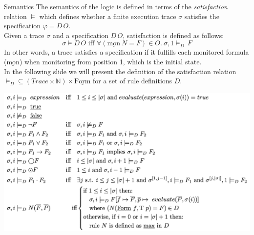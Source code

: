\documentclass[aspectratio=169,t,xcolor=table]{beamer}
\begin{document}
\begin{frame}[allowframebreaks]{Semantics}
    The semantics of the logic is defined in terms of the \textit{satisfaction} relation $\models$ which defines whether a finite execution trace $\sigma$ satisfies the specification $\varphi=D \, O$.\\
    \vspace*{5mm}
    Given a trace $\sigma$ and a specification $D \, O$, satisfaction is defined as follows:
    \[
    \sigma \models D \, O \text{ iff } \forall (\underline{\text{mon}}\ N = F) \in O.\ \sigma ,1 \models_D \, F
    \]
    In other words, a trace satisfies a specification if it fulfills each monitored formula ($\underline{\text{mon}}$) when monitoring from position 1, which is the initial state.\\
    \vspace*{5mm}
    In the following slide we will present the definition of the satisfaction relation $\models_D \subseteq (Trace \times \mathbb{N}) \times \underline{\text{Form}}$ for a set of rule definitions $D$. 

    \includegraphics[scale=0.22]{images/semantics.png}
\end{frame}
\end{document}
